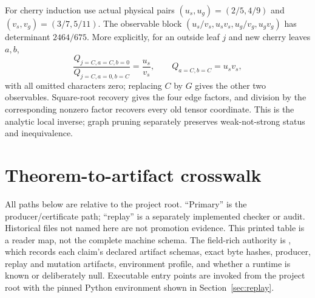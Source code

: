 \documentclass[11pt]{article}
\theoremstyle{remark}
\begin{document}
For cherry induction use actual physical pairs
\((u_s,u_g)=(2/5,4/9)\) and \((v_s,v_g)=(3/7,5/11)\).  The observable block
\((u_s/v_s,u_sv_s,u_g/v_g,u_gv_g)\) has determinant \(2464/675\).  More
explicitly, for an outside leaf \(j\) and new cherry leaves \(a,b\),
\[
 \frac{Q_{j=C,a=C,b=0}}{Q_{j=C,a=0,b=C}}=\frac{u_s}{v_s},
 \qquad Q_{a=C,b=C}=u_sv_s,
\]
with all omitted characters zero; replacing \(C\) by \(G\) gives the other
two observables.  Square-root recovery gives the four edge factors, and
division by the corresponding nonzero factor recovers every old tensor
coordinate.  This is the analytic local inverse; graph pruning separately
preserves weak-not-strong status and inequivalence.

\section{Theorem-to-artifact crosswalk}\label{sec:crosswalk}

All paths below are relative to the
 project root.  ``Primary'' is the
producer/certificate path; ``replay'' is a separately implemented checker or
audit.  Historical files not named here are not promotion evidence.  This
printed table is a reader map, not the complete machine schema.  The
field-rich authority is
,
which records each claim's declared artifact schemas, exact byte hashes,
producer, replay and mutation artifacts, environment profile, and whether a
runtime is known or deliberately null.  Executable entry points are invoked
from the project root with the pinned Python environment shown in
Section~\ref{sec:replay}.
\end{document}
